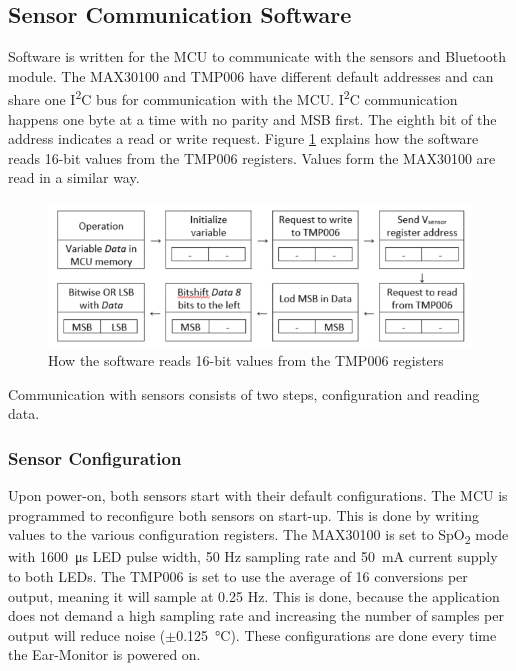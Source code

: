 \subsection{Sensor Communication Software}
Software is written for the MCU to communicate with the sensors and Bluetooth module. The MAX30100 and TMP006 have different default addresses and can share one I\textsuperscript{2}C bus for communication with the MCU. I\textsuperscript{2}C communication happens one byte at a time with no parity and MSB first. The eighth bit of the address indicates a read or write request. Figure \ref{fig:I2C_Read} explains how the software reads 16-bit values from the TMP006 registers. Values form the MAX30100 are read in a similar way.

\begin{figure}[H]
   \centering
   \includegraphics[scale=1]{figs/I2C_Read.png}
   \caption{How the software reads 16-bit values from the TMP006 registers}
   \label{fig:I2C_Read}
\end{figure}

Communication with sensors consists of two steps, configuration and reading data.

\subsubsection{Sensor Configuration}
Upon power-on, both sensors start with their default configurations. The MCU is programmed to reconfigure both sensors on start-up. This is done by writing values to the various configuration registers. The MAX30100 is set to SpO\textsubscript{2} mode with \SI{1600}{\micro\second} LED pulse width, 50 Hz sampling rate and \SI{50}{\milli\ampere} current supply to both LEDs. The TMP006 is set to use the average of 16 conversions per output, meaning it will sample at 0.25 Hz. This is done, because the application does not demand a high sampling rate and increasing the number of samples per output will reduce noise ($\pm$\SI{0.125}{\celsius}). These configurations are done every time the Ear-Monitor is powered on.

